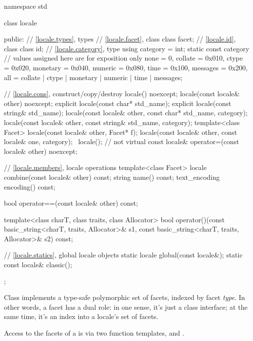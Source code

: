 \begin{codeblock}
namespace std {
  class locale {
  public:
    // \ref{locale.types}, types
    // \ref{locale.facet}, class 
    class facet;
    // \ref{locale.id}, class 
    class id;
    // \ref{locale.category}, type 
    using category = int;
    static const category   // values assigned here are for exposition only
      none     = 0,
      collate  = 0x010, ctype    = 0x020,
      monetary = 0x040, numeric  = 0x080,
      time     = 0x100, messages = 0x200,
      all = collate | ctype | monetary | numeric | time | messages;

    // \ref{locale.cons}, construct/copy/destroy
    locale() noexcept;
    locale(const locale& other) noexcept;
    explicit locale(const char* std_name);
    explicit locale(const string& std_name);
    locale(const locale& other, const char* std_name, category);
    locale(const locale& other, const string& std_name, category);
    template<class Facet> locale(const locale& other, Facet* f);
    locale(const locale& other, const locale& one, category);
    ~locale();                  // not virtual
    const locale& operator=(const locale& other) noexcept;

    // \ref{locale.members}, locale operations
    template<class Facet> locale combine(const locale& other) const;
    string name() const;
    text_encoding encoding() const;

    bool operator==(const locale& other) const;

    template<class charT, class traits, class Allocator>
      bool operator()(const basic_string<charT, traits, Allocator>& s1,
                      const basic_string<charT, traits, Allocator>& s2) const;

    // \ref{locale.statics}, global locale objects
    static       locale  global(const locale&);
    static const locale& classic();
  };
}
\end{codeblock}

\pnum
Class  implements a type-safe polymorphic set of facets,
indexed by facet \textit{type}.
In other words, a facet has a dual role:
in one sense, it's just a class interface;
at the same time, it's an index into a locale's set of facets.

\pnum
Access to the facets of a  is via two function templates,
 and .

